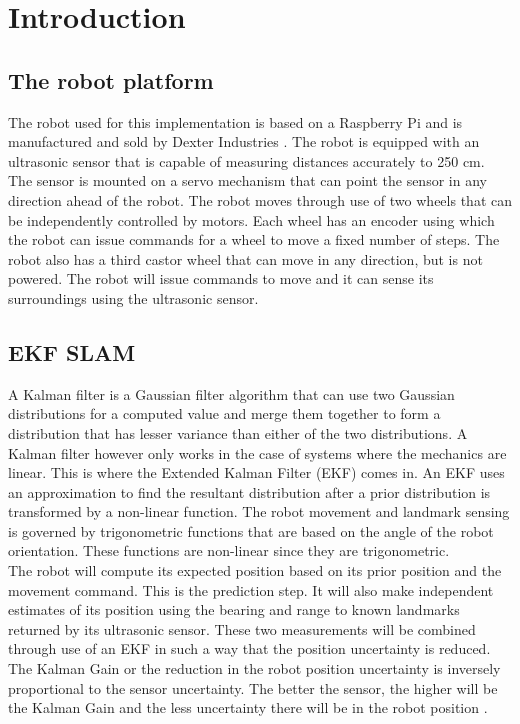 \documentclass[conference]{IEEEtran}
\begin{document}
\section{Introduction}
\subsection{The robot platform}
The robot used for this implementation is based on a Raspberry Pi and is manufactured and sold by Dexter Industries \cite{dexter}. The robot is equipped with an ultrasonic sensor that is capable of measuring distances accurately to 250 cm. The sensor is mounted on a servo mechanism that can point the sensor in any direction ahead of the robot. The robot moves through use of two wheels that can be independently controlled by motors. Each wheel has an encoder using which the robot can issue commands for a wheel to move a fixed number of steps. The robot also has a third castor wheel that can move in any direction, but is not powered. The robot will issue commands to move and it can sense its surroundings using the ultrasonic sensor.
\subsection{EKF SLAM}
A Kalman filter is a Gaussian filter algorithm that can use two Gaussian distributions for a computed value and merge them together to form a distribution that has lesser variance than either of the two distributions. A Kalman filter however only works in the case of systems where the mechanics are linear. This is where the Extended Kalman Filter (EKF) comes in. An EKF uses an approximation to find the resultant distribution after a prior distribution is transformed by a non-linear function. The robot movement and landmark sensing is governed by trigonometric functions that are based on the angle of the robot orientation. These functions are non-linear since they are trigonometric.\\

The robot will compute its expected position based on its prior position and the movement command. This is the prediction step. It will also make independent estimates of its position using the bearing and range to known landmarks returned by its ultrasonic sensor. These two measurements will be combined through use of an EKF in such a way that the position uncertainty is reduced. The Kalman Gain or the reduction in the robot position uncertainty is inversely proportional to the sensor uncertainty. The better the sensor, the higher will be the Kalman Gain and the less uncertainty there will be in the robot position  \cite{stachniss}.
\end{document}
